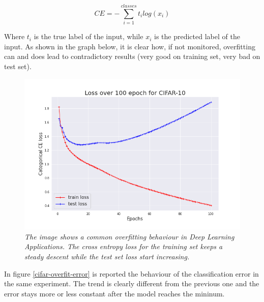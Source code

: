 \documentclass[11pt,a4paper]{article}
\begin{document}
\begin{equation}
  CE = -\sum_{i=1}^{classes} t_i log(x_i)
\end{equation}

Where $t_i$ is the true label of the input, while $x_i$ is the predicted label of the input.
As shown in the graph below, it is clear how, if not monitored, overfitting can and does lead to contradictory results (very good on training set, very bad on test set). 

\begin{figure}[H]
 \centering
 \includegraphics[scale=0.4]{../images/cifar10_100epochs_loss.png}
 \caption{\textit{The image shows a common overfitting behaviour in Deep Learning Applications. The cross entropy loss for the training set keeps a steady descent while the test set loss start increasing.}}  
 \label{cifar-overfit-loss}
\end{figure}

In figure \ref{cifar-overfit-error} is reported the behaviour of the classification error in the same experiment. The trend is clearly different from the previous one and the error stays more or less constant after the model reaches the mininum. 
\end{document}
